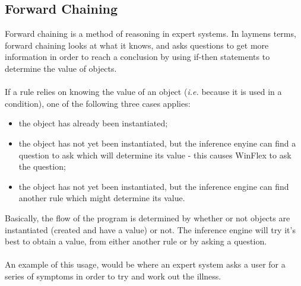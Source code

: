 \documentclass[12pt]{report}
\begin{document}
\subsection{Forward Chaining}\label{subsec:forward_chaining}
Forward chaining is a method of reasoning in expert systems.  In laymens terms, forward chaining looks at what it knows, and asks questions to get more information in order to reach a conclusion by using if-then statements to determine the value of objects.\\
\\
If a rule relies on knowing the value of an object (\textit{i.e.} because it is used in a condition), one of the following three cases applies:
\begin{itemize}
	\item the object has already been instantiated;
	\item the object has not yet been instantiated, but the inference enyine can find a question to ask which will determine its value - this causes WinFlex to ask the question;
	\item the object has not yet been instantiated, but the inference engine can find another rule which might determine its value. 
\end{itemize}
\citep{forwardchaning09}
Basically, the flow of the program is determined by whether or not objects are instantiated (created and have a value) or not.  The inference engine will try it's best to obtain a value, from either another rule or by asking a question.\\
\\
An example of this usage, would be where an expert system asks a user for a series of symptoms in order to try and work out the illness.
\end{document}
